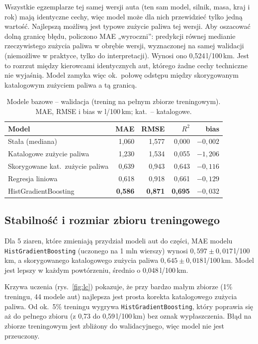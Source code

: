 \documentclass[10pt,twocolumn,a4paper]{article}
\newcommand{\lkm}{\,l/100\,km}
\begin{document}
Wszystkie egzemplarze tej samej wersji auta (ten sam model, silnik, masa,
kraj i rok) mają identyczne cechy, więc model może dla nich przewidzieć tylko
jedną wartość. Najlepszą możliwą jest typowe zużycie paliwa tej wersji. Aby
oszacować dolną granicę błędu, policzono MAE „wyroczni”: predykcji równej
medianie rzeczywistego zużycia paliwa w obrębie wersji, wyznaczonej na samej
walidacji (niemożliwe w praktyce, tylko do interpretacji). Wynosi ono
0,524\lkm. Jest to rozrzut między kierowcami identycznych aut, którego żadne
cechy techniczne nie wyjaśnią. Model zamyka więc ok.\ połowę odstępu między
skorygowanym katalogowym zużyciem paliwa a tą granicą.

\begin{table}[H]
\centering
\caption{Modele bazowe -- walidacja (trening na pełnym zbiorze treningowym).
MAE, RMSE i bias w l/100\,km; kat.\ -- katalogowe.}
\label{tab:baseline}
\footnotesize
\renewcommand{\arraystretch}{1.25}
\setlength{\tabcolsep}{4pt}
\begin{tabular}{@{}lrrrr@{}}
\toprule
Model & MAE & RMSE & $R^2$ & bias\\
\midrule
Stała (mediana) & 1,060 & 1,577 & 0,000 & $-0,002$\\
Katalogowe zużycie paliwa & 1,230 & 1,534 & 0,055 & $-1,206$\\
Skorygowane kat.\ zużycie paliwa & 0,639 & 0,943 & 0,643 & $-0,116$\\
Regresja liniowa & 0,618 & 0,918 & 0,661 & $-0,129$\\
HistGradientBoosting & \textbf{0,586} & \textbf{0,871} & \textbf{0,695} & $-0,032$\\
\bottomrule
\end{tabular}
\end{table}

\subsection{Stabilność i rozmiar zbioru treningowego}\label{sec:stab}
Dla 5 ziaren, które zmieniają przydział modeli aut do części, MAE modelu
\texttt{HistGradientBoosting} (uczonego na 1 mln wierszy) wynosi
$0,597 \pm 0,017$\lkm, a skorygowanego katalogowego zużycia paliwa
$0,645 \pm 0,018$\lkm. Model jest lepszy w każdym powtórzeniu, średnio
o 0,048\lkm.

Krzywa uczenia (rys.~\ref{fig:lc}) pokazuje, że przy bardzo małym zbiorze
(1\% treningu, 44 modele aut) najlepsza jest prosta korekta katalogowego
zużycia paliwa. Od ok.\ 5\% treningu wygrywa \texttt{HistGradientBoosting},
który poprawia się aż do pełnego zbioru (z 0,73 do 0,59\lkm) bez oznak
wypłaszczenia. Błąd na zbiorze treningowym jest zbliżony do walidacyjnego,
więc model nie jest przeuczony.
\end{document}
